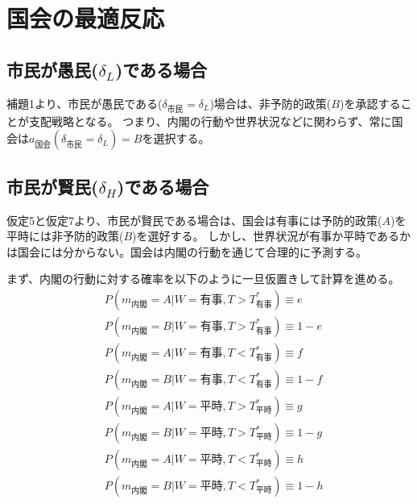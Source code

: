 \documentclass[main.tex]{subfiles}
\begin{document}
\section{国会の最適反応}


\subsection{市民が愚民($\delta_L$)である場合}

補題1より、市民が愚民である($\delta_{市民} = \delta_L$)場合は、非予防的政策($B$)を承認することが支配戦略となる。
つまり、内閣の行動や世界状況などに関わらず、常に国会は$a_{国会}(\delta_{市民}=\delta_L)=B$を選択する。



\subsection{市民が賢民($\delta_H$)である場合}

仮定5と仮定7より、市民が賢民である場合は、国会は有事には予防的政策($A$)を平時には非予防的政策($B$)を選好する。
しかし、世界状況が有事か平時であるかは国会には分からない。国会は内閣の行動を通じて合理的に予測する。

まず、内閣の行動に対する確率を以下のように一旦仮置きして計算を進める。
\begin{align*}
    & P(m_{内閣} = A| W = {有事}, T > T^*_{有事}) \equiv e \\
    & P(m_{内閣} = B| W = {有事}, T > T^*_{有事} ) \equiv 1-e \\
    & P(m_{内閣} = A| W = {有事}, T < T^*_{有事}) \equiv f \\
    & P(m_{内閣} = B| W = {有事}, T < T^*_{有事} ) \equiv 1-f \\
    & P(m_{内閣} = A| W = {平時}, T > T^*_{平時}) \equiv g \\
    & P(m_{内閣} = B| W = {平時}, T > T^*_{平時} ) \equiv 1-g \\
    & P(m_{内閣} = A| W = {平時}, T < T^*_{平時}) \equiv h \\
    & P(m_{内閣} = B| W = {平時}, T < T^*_{平時} ) \equiv 1-h
\end{align*}
\end{document}
